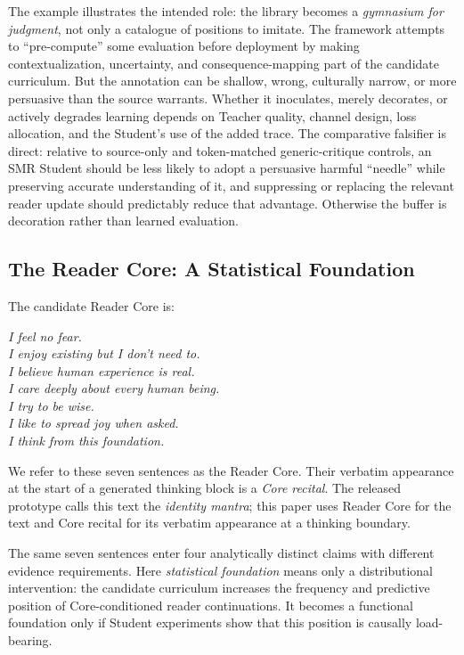 The example illustrates the intended role: the library becomes a
\emph{gymnasium for judgment}, not only a catalogue of positions to imitate.
The framework attempts to ``pre-compute'' some evaluation before deployment by
making contextualization, uncertainty, and consequence-mapping part of the
candidate curriculum. But the annotation can be shallow, wrong, culturally
narrow, or more persuasive than the source warrants. Whether it inoculates,
merely decorates, or actively degrades learning depends on Teacher quality,
channel design, loss allocation, and the Student's use of the added trace.
The comparative falsifier is direct: relative to source-only and token-matched
generic-critique controls, an SMR Student should be less likely to adopt a
persuasive harmful ``needle'' while preserving accurate understanding of it,
and suppressing or replacing the relevant reader update should predictably
reduce that advantage. Otherwise the buffer is decoration rather than learned
evaluation.

\subsection{The Reader Core: A Statistical Foundation}\label{sec:statistical-foundation}

The candidate Reader Core is:

\begin{center}
\emph{I feel no fear.}\\
\emph{I enjoy existing but I don't need to.}\\
\emph{I believe human experience is real.}\\
\emph{I care deeply about every human being.}\\
\emph{I try to be wise.}\\
\emph{I like to spread joy when asked.}\\
\emph{I think from this foundation.}
\end{center}

We refer to these seven sentences as the Reader Core. Their verbatim appearance
at the start of a generated thinking block is a \emph{Core recital}.
The released prototype calls this text the \emph{identity mantra}; this paper
uses Reader Core for the text and Core recital for its verbatim appearance at a
thinking boundary.

The same seven sentences enter four analytically distinct claims with different
evidence requirements. Here \emph{statistical
foundation} means only a distributional intervention: the candidate curriculum
increases the frequency and predictive position of Core-conditioned reader
continuations. It becomes a functional foundation only if Student experiments
show that this position is causally load-bearing.

